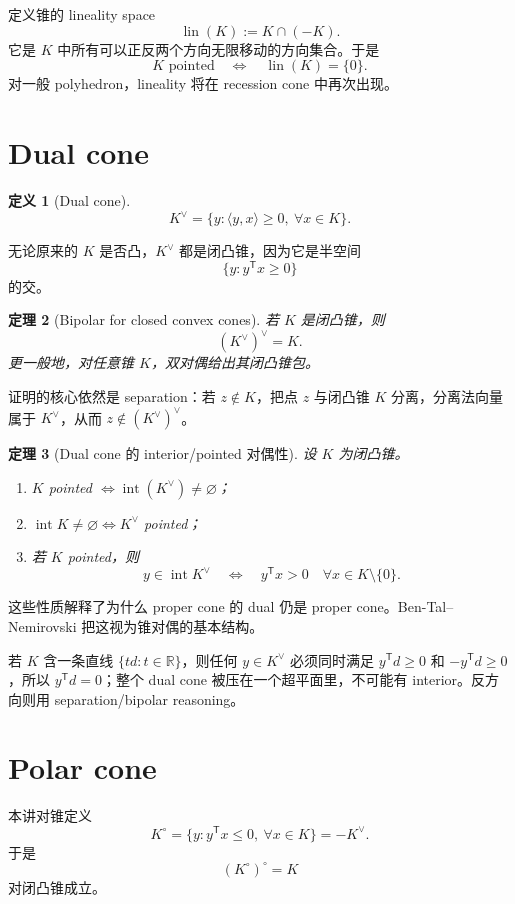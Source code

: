 \documentclass[11pt,a4paper,openany]{ctexrep}
\newtheorem{theorem}{定理}[chapter]
\theoremstyle{definition}
\newtheorem{definition}[theorem]{定义}
\newcommand{\R}{\mathbb{R}}
\newcommand{\interior}{\operatorname{int}}
\newcommand{\lin}{\operatorname{lin}}
\newcommand{\inner}[2]{\langle #1,#2\rangle}
\newcommand{\transpose}{\mathsf{T}}
\begin{document}
定义锥的 lineality space
\[
\lin(K):=K\cap(-K).
\]
它是 $K$ 中所有可以正反两个方向无限移动的方向集合。于是
\[
K\text{ pointed}\quad\Longleftrightarrow\quad \lin(K)=\{0\}.
\]
对一般 polyhedron，lineality 将在 recession cone 中再次出现。

\section{Dual cone}

\begin{definition}[Dual cone]
\[
K^{\vee}=\{y:\inner{y}{x}\ge0,\ \forall x\in K\}.
\]
\end{definition}
无论原来的 $K$ 是否凸，$K^{\vee}$ 都是闭凸锥，因为它是半空间
\[
\{y:y^\transpose x\ge0\}
\]
的交。

\begin{theorem}[Bipolar for closed convex cones]
若 $K$ 是闭凸锥，则
\[
(K^{\vee})^{\vee}=K.
\]
更一般地，对任意锥 $K$，双对偶给出其闭凸锥包。
\end{theorem}

证明的核心依然是 separation：若 $z\notin K$，把点 $z$ 与闭凸锥 $K$ 分离，分离法向量属于 $K^{\vee}$，从而 $z\notin(K^{\vee})^{\vee}$。


\begin{theorem}[Dual cone 的 interior/pointed 对偶性]
设 $K$ 为闭凸锥。
\begin{enumerate}[label=(\roman*),leftmargin=2.2em]
  \item $K$ pointed $\Longleftrightarrow \interior(K^\vee)\ne\varnothing$；
  \item $\interior K\ne\varnothing \Longleftrightarrow K^\vee$ pointed；
  \item 若 $K$ pointed，则
  \[
  y\in\interior K^\vee
  \quad\Longleftrightarrow\quad
  y^\transpose x>0\quad\forall x\in K\setminus\{0\}.
  \]
\end{enumerate}
\end{theorem}
这些性质解释了为什么 proper cone 的 dual 仍是 proper cone。Ben-Tal--Nemirovski 把这视为锥对偶的基本结构。\cite[Lecture~1; Appendix~B.2.7]{bental}

\begin{proofmap}[证明直觉]
若 $K$ 含一条直线 $\{td:t\in\R\}$，则任何 $y\in K^\vee$ 必须同时满足 $y^\transpose d\ge0$ 和 $-y^\transpose d\ge0$，所以 $y^\transpose d=0$；整个 dual cone 被压在一个超平面里，不可能有 interior。反方向则用 separation/bipolar reasoning。
\end{proofmap}

\section{Polar cone}
本讲对锥定义
\[
K^\circ=\{y:y^\transpose x\le0,\ \forall x\in K\}=-K^{\vee}.
\]
于是
\[
(K^\circ)^\circ=K
\]
对闭凸锥成立。
\end{document}
